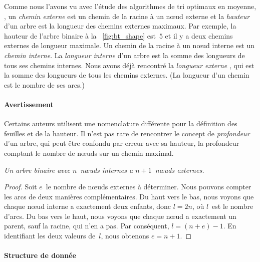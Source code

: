 Comme nous l'avons vu avec l'étude des algorithmes de tri optimaux en
moyenne, , un \emph{chemin
  externe} est un chemin de la racine à un
n{\oe}ud externe et la
\emph{hauteur} d'un arbre est la longueur des
chemins externes maximaux. Par exemple, la hauteur de l'arbre binaire
à la \fig~\vref{fig:bt_shape} est~\(5\) et il y a deux chemins
externes de longueur maximale. Un chemin de la racine à un n{\oe}ud
interne est un \emph{chemin interne}. La
\emph{longueur interne} d'un arbre est
la somme des longueurs de tous ses chemins internes. Nous avons déjà
rencontré la \emph{longueur externe} ,
qui est la somme des longueurs de tous les chemins externes. (La
longueur d'un chemin est le nombre de ses arcs.)

\paragraph{Avertissement}

Certains auteurs utilisent une nomenclature différente pour la
définition des feuilles et de la hauteur. Il n'est pas rare de
rencontrer le concept de \emph{profondeur} d'un arbre, qui peut être confondu par erreur
avec sa hauteur, la profondeur comptant le nombre de n{\oe}uds sur un
chemin maximal.
\begin{thm}%
\label{thm_int_ext}
\textsl{Un arbre binaire avec \(n\)~n{\oe}uds internes a
  \(n+1\)~n{\oe}uds externes.}
\end{thm}
\begin{proof}
  Soit \(e\)~le nombre de n{\oe}uds externes à déterminer. Nous
  pouvons compter les arcs de deux manières complémentaires. Du haut
  vers le bas, nous voyons que chaque n{\oe}ud interne a exactement
  deux enfants, donc \(l=2n\), où \(l\)~est le nombre d'arcs. Du bas
  vers le haut, nous voyons que chaque n{\oe}ud a exactement un
  parent, sauf la racine, qui n'en a pas. Par conséquent,
  \(l=(n+e)-1\). En identifiant les deux valeurs de~\(l\), nous
  obtenons \(e=n+1\).
\end{proof}

\paragraph{Structure de donnée}

